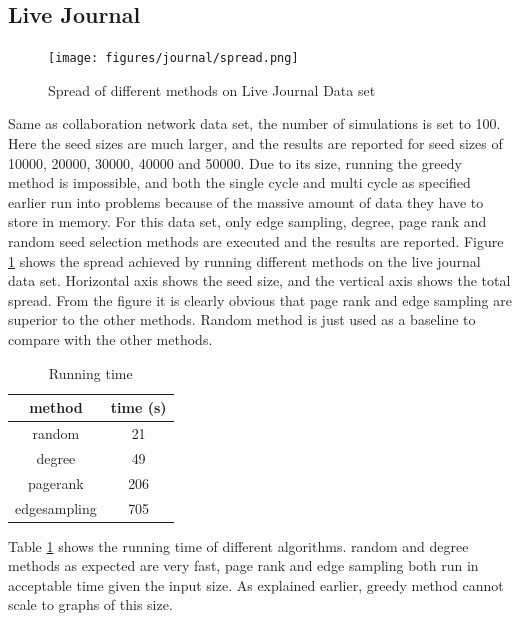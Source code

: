 \documentclass[english]{tktltiki}
\begin{document}
\subsection{Live Journal}

\begin{figure}[ht!]
\centering
\texttt{[image: figures/journal/spread.png]}
\caption{Spread of different methods on Live Journal Data set}
\label{journal:spread}
\end{figure}

Same as collaboration network data set, the number of simulations is set to 100. Here the seed sizes are much larger, and the results are reported for seed sizes of 10000, 20000, 30000, 40000 and 50000. Due to its size, running the greedy method is impossible, and both the single cycle and multi cycle as specified earlier run into problems because of the massive amount of data they have to store in memory. For this data set, only edge sampling, degree, page rank and random seed selection methods are executed and the results are reported.
Figure \ref{journal:spread} shows the spread achieved by running different methods on the live journal data set. Horizontal axis shows the seed size, and the vertical axis shows the total spread. From the figure it is clearly obvious that page rank and edge sampling are superior to the other methods. Random method is just used as a baseline to compare with the other methods.

\begin{table}[ht!]
\centering
\begin{tabular}{ |c|c| }
\hline 
  method & time (s)\\
  \hline 
  random & 21\\
  degree & 49\\
  pagerank&206\\
  edgesampling&705\\
  \hline 
\end{tabular}
\caption{Running time}
\label{journal:time}
\end{table}

Table \ref{journal:time} shows the running time of different algorithms. random and degree methods as expected are very fast, page rank and edge sampling both run in acceptable time given the input size. As explained earlier, greedy method cannot scale to graphs of this size. 
\end{document}
